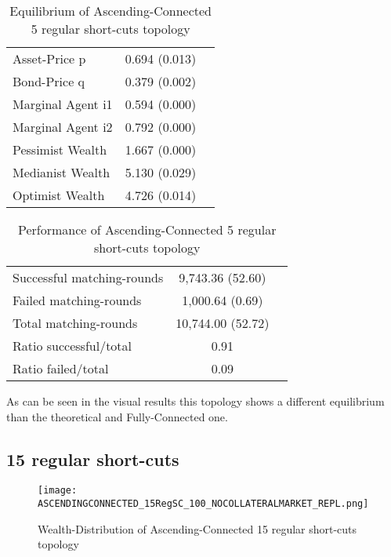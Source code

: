 \documentclass[Bachelorarbeit.tex]{subfiles}
\begin{document}
\begin{table}[H]
	\caption{Equilibrium of Ascending-Connected 5 regular short-cuts topology}
	\centering
	\begin{tabular} { l c r }
		\hline
		Asset-Price p & 0.694 (0.013) \\
		Bond-Price q & 0.379 (0.002) \\
		Marginal Agent i1 & 0.594 (0.000) \\
		Marginal Agent i2 & 0.792 (0.000) \\
		\hline
		Pessimist Wealth & 1.667 (0.000) \\
		Medianist Wealth & 5.130 (0.029) \\
		Optimist Wealth & 4.726 (0.014) \\
		\hline
	\end{tabular}
\end{table} 

\begin{table}[H]
	\caption{Performance of Ascending-Connected 5 regular short-cuts topology}
	\centering
	\begin{tabular} { l c r }
		\hline
		Successful matching-rounds & 9,743.36 (52.60) \\
		Failed matching-rounds & 1,000.64 (0.69) \\
		Total matching-rounds & 10,744.00 (52.72) \\
		\hline
		Ratio successful/total & 0.91 \\
		Ratio failed/total & 0.09 \\
		\hline
	\end{tabular}
\end{table}

As can be seen in the visual results this topology shows a different equilibrium than the theoretical and Fully-Connected one.

\subsection{15 regular short-cuts}
\begin{figure}[H]
	\centering
  \texttt{[image: ASCENDINGCONNECTED\_15RegSC\_100\_NOCOLLATERALMARKET\_REPL.png]}
	\caption{Wealth-Distribution of Ascending-Connected 15 regular short-cuts topology}
	\label{fig:wealth_ASCENDINGCONNECTED_15RegSC_100_NOCOLLATERALMARKET_REPL}
\end{figure}
\end{document}
